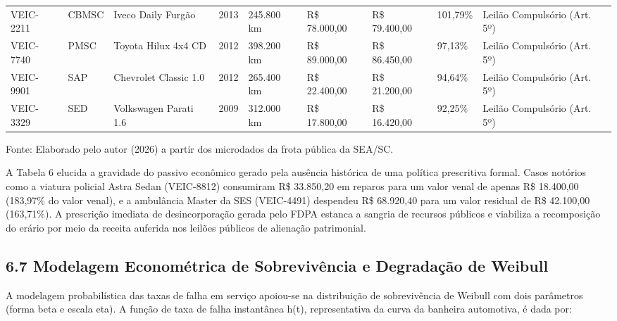 \documentclass[10pt,a4paper,journal]{article}
\begin{document}
\begin{table}[htbp]
\begin{tabular}{lllllllll}
VEIC-2211 & CBMSC & Iveco Daily Furgão & 2013 & 245.800 km & R\$ 78.000,00 & R\$ 79.400,00 & 101,79\% & Leilão Compulsório (Art. 5º) \\
VEIC-7740 & PMSC & Toyota Hilux 4x4 CD & 2012 & 398.200 km & R\$ 89.000,00 & R\$ 86.450,00 & 97,13\% & Leilão Compulsório (Art. 5º) \\
VEIC-9901 & SAP & Chevrolet Classic 1.0 & 2012 & 265.400 km & R\$ 22.400,00 & R\$ 21.200,00 & 94,64\% & Leilão Compulsório (Art. 5º) \\
VEIC-3329 & SED & Volkswagen Parati 1.6 & 2009 & 312.000 km & R\$ 17.800,00 & R\$ 16.420,00 & 92,25\% & Leilão Compulsório (Art. 5º) \\
\bottomrule
\end{tabular}
\end{table}
Fonte: Elaborado pelo autor (2026) a partir dos microdados da frota pública da SEA/SC.

A Tabela 6 elucida a gravidade do passivo econômico gerado pela ausência histórica de uma política prescritiva formal. Casos notórios como a viatura policial Astra Sedan (VEIC-8812) consumiram R\$ 33.850,20 em reparos para um valor venal de apenas R\$ 18.400,00 (183,97\% do valor venal), e a ambulância Master da SES (VEIC-4491) despendeu R\$ 68.920,40 para um valor residual de R\$ 42.100,00 (163,71\%). A prescrição imediata de desincorporação gerada pelo FDPA estanca a sangria de recursos públicos e viabiliza a recomposição do erário por meio da receita auferida nos leilões públicos de alienação patrimonial.

\subsection{6.7 Modelagem Econométrica de Sobrevivência e Degradação de Weibull}
A modelagem probabilística das taxas de falha em serviço apoiou-se na distribuição de sobrevivência de Weibull com dois parâmetros (forma beta e escala eta). A função de taxa de falha instantânea h(t), representativa da curva da banheira automotiva, é dada por:
\end{document}
